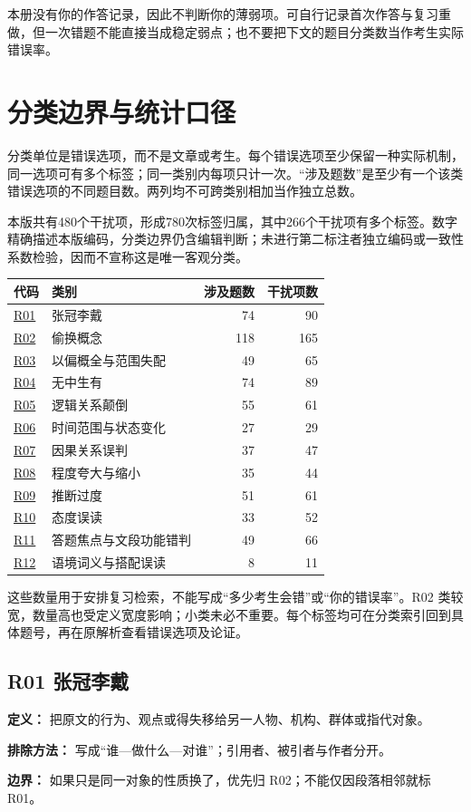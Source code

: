 \documentclass[11pt,a4paper]{article}
\begin{document}
本册没有你的作答记录，因此不判断你的薄弱项。可自行记录首次作答与复习重做，但一次错题不能直接当成稳定弱点；也不要把下文的题目分类数当作考生实际错误率。

\clearpage\section{分类边界与统计口径}\label{taxonomy}
分类单位是错误选项，而不是文章或考生。每个错误选项至少保留一种实际机制，同一选项可有多个标签；同一类别内每项只计一次。“涉及题数”是至少有一个该类错误选项的不同题目数。两列均不可跨类别相加当作独立总数。

本版共有480个干扰项，形成780次标签归属，其中266个干扰项有多个标签。数字精确描述本版编码，分类边界仍含编辑判断；未进行第二标注者独立编码或一致性系数检验，因而不宣称这是唯一客观分类。

\begin{longtable}{@{}p{1.2cm}p{8.7cm}rr@{}}\toprule 代码 & 类别 & 涉及题数 & 干扰项数\\\midrule\endhead
\hyperref[cat-R01]{R01} & 张冠李戴 & 74 & 90\\
\hyperref[cat-R02]{R02} & 偷换概念 & 118 & 165\\
\hyperref[cat-R03]{R03} & 以偏概全与范围失配 & 49 & 65\\
\hyperref[cat-R04]{R04} & 无中生有 & 74 & 89\\
\hyperref[cat-R05]{R05} & 逻辑关系颠倒 & 55 & 61\\
\hyperref[cat-R06]{R06} & 时间范围与状态变化 & 27 & 29\\
\hyperref[cat-R07]{R07} & 因果关系误判 & 37 & 47\\
\hyperref[cat-R08]{R08} & 程度夸大与缩小 & 35 & 44\\
\hyperref[cat-R09]{R09} & 推断过度 & 51 & 61\\
\hyperref[cat-R10]{R10} & 态度误读 & 33 & 52\\
\hyperref[cat-R11]{R11} & 答题焦点与文段功能错判 & 49 & 66\\
\hyperref[cat-R12]{R12} & 语境词义与搭配误读 & 8 & 11\\
\bottomrule\end{longtable}
这些数量用于安排复习检索，不能写成“多少考生会错”或“你的错误率”。R02 类较宽，数量高也受定义宽度影响；小类未必不重要。每个标签均可在分类索引回到具体题号，再在原解析查看错误选项及论证。

\subsection{R01 张冠李戴}\label{cat-R01}
\noindent\textbf{定义：} 把原文的行为、观点或得失移给另一人物、机构、群体或指代对象。\par\smallskip
\noindent\textbf{排除方法：} 写成“谁—做什么—对谁”；引用者、被引者与作者分开。\par\smallskip
\noindent\textbf{边界：} 如果只是同一对象的性质换了，优先归 R02；不能仅因段落相邻就标 R01。\par\smallskip
{}
\end{document}
